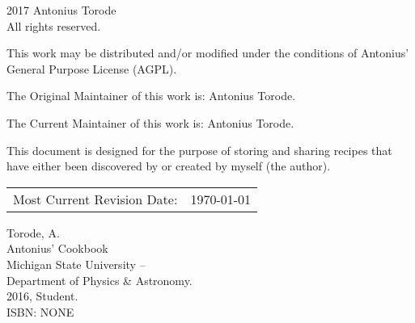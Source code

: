 \pagestyle{empty}

\begingroup
\footnotesize
\parindent 0pt
\parskip \baselineskip
\textcopyright{} 2017 Antonius Torode \\
All rights reserved.

This work may be distributed and/or modified under the conditions of Antonius’ General Purpose License (AGPL).

The Original Maintainer of this work is: Antonius Torode.

The Current Maintainer of this work is: Antonius Torode.

This document is designed for the purpose of storing and sharing recipes that have either been discovered by or created by myself (the author).

\begin{center}
\begin{tabular}{ll}
Most Current Revision Date: &  \today 
\end{tabular}
\end{center}

\vfill


Torode, A.\\
\hspace*{2em} Antonius' Cookbook \\
\hspace*{2em} Michigan State University -- \\
\hspace*{2em} Department of Physics \& Astronomy. \\
\hspace*{2em} 2016, Student. \\
\hspace*{2em} ISBN: NONE \\



\endgroup
\clearpage